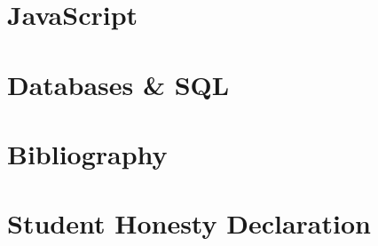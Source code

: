 \section{JavaScript}


\clearpage


\section{Databases \& SQL}


\clearpage

\section{Bibliography}

\renewcommand{\refname}{\spacedlowsmallcaps{References}} %



%


%


\section{Student Honesty Declaration}





